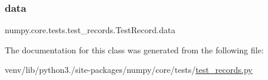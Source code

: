 \subsubsection{\texorpdfstring{data}{data}}
{\footnotesize\ttfamily numpy.\+core.\+tests.\+test\+\_\+records.\+Test\+Record.\+data}



The documentation for this class was generated from the following file\+:\begin{DoxyCompactItemize}
\item 
venv/lib/python3./site-\/packages/numpy/core/tests/\hyperlink{test__records_8py}{test\+\_\+records.\+py}\end{DoxyCompactItemize}
